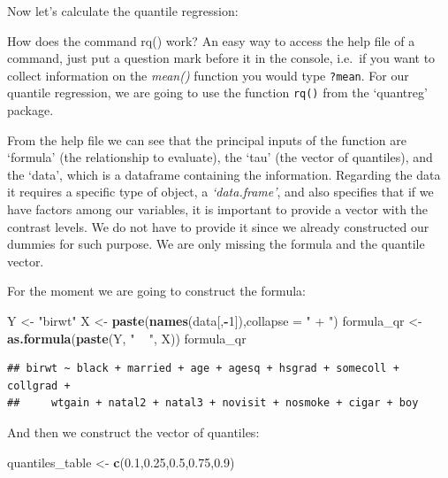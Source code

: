 \documentclass[]{book}
\newenvironment{Shaded}{\begin{snugshade}}{\end{snugshade}}
\newcommand{\KeywordTok}[1]{\textcolor[rgb]{0.13,0.29,0.53}{\textbf{#1}}}
\newcommand{\DataTypeTok}[1]{\textcolor[rgb]{0.13,0.29,0.53}{#1}}
\newcommand{\DecValTok}[1]{\textcolor[rgb]{0.00,0.00,0.81}{#1}}
\newcommand{\FloatTok}[1]{\textcolor[rgb]{0.00,0.00,0.81}{#1}}
\newcommand{\StringTok}[1]{\textcolor[rgb]{0.31,0.60,0.02}{#1}}
\newcommand{\OperatorTok}[1]{\textcolor[rgb]{0.81,0.36,0.00}{\textbf{#1}}}
\newcommand{\NormalTok}[1]{#1}
\begin{document}
Now let's calculate the quantile regression:

How does the command rq() work? An easy way to access the help file of a
command, just put a question mark before it in the console, i.e.~if you
want to collect information on the \emph{mean()} function you would type
\texttt{?mean}. For our quantile regression, we are going to use the
function \texttt{rq()} from the `quantreg' package.

From the help file we can see that the principal inputs of the function
are `formula' (the relationship to evaluate), the `tau' (the vector of
quantiles), and the `data', which is a dataframe containing the
information. Regarding the data it requires a specific type of object, a
\emph{`data.frame'}, and also specifies that if we have factors among
our variables, it is important to provide a vector with the contrast
levels. We do not have to provide it since we already constructed our
dummies for such purpose. We are only missing the formula and the
quantile vector.

For the moment we are going to construct the formula:

\begin{Shaded}
\begin{Highlighting}[]
\NormalTok{Y <-}\StringTok{ "birwt"}
\NormalTok{X <-}\StringTok{ }\KeywordTok{paste}\NormalTok{(}\KeywordTok{names}\NormalTok{(data[,}\OperatorTok{-}\DecValTok{1}\NormalTok{]),}\DataTypeTok{collapse =} \StringTok{" + "}\NormalTok{)}
\NormalTok{formula_qr <-}\StringTok{ }\KeywordTok{as.formula}\NormalTok{(}\KeywordTok{paste}\NormalTok{(Y, }\StringTok{" ~ "}\NormalTok{, X))}
\NormalTok{formula_qr}
\end{Highlighting}
\end{Shaded}

\begin{verbatim}
## birwt ~ black + married + age + agesq + hsgrad + somecoll + collgrad +
##     wtgain + natal2 + natal3 + novisit + nosmoke + cigar + boy
\end{verbatim}

And then we construct the vector of quantiles:

\begin{Shaded}
\begin{Highlighting}[]
\NormalTok{quantiles_table <-}\StringTok{ }\KeywordTok{c}\NormalTok{(}\FloatTok{0.1}\NormalTok{,}\FloatTok{0.25}\NormalTok{,}\FloatTok{0.5}\NormalTok{,}\FloatTok{0.75}\NormalTok{,}\FloatTok{0.9}\NormalTok{)}
\end{Highlighting}
\end{Shaded}
\end{document}
